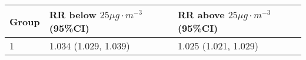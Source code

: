 \begin{tabular}{lll}
  \hline
Group & RR below $25 \mu g \cdot m^{-3}$ (95\%CI) & RR above $25 \mu g \cdot m^{-3}$ (95\%CI) \\ 
  \hline
   1 & 1.034 (1.029, 1.039) & 1.025 (1.021, 1.029) \\ 
   \hline
\end{tabular}

